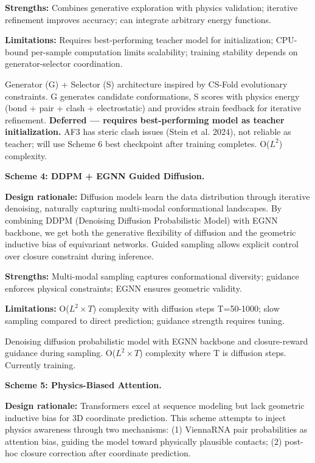 \documentclass[12pt]{article}
\begin{document}
\textbf{Strengths:} Combines generative exploration with physics validation; iterative refinement improves accuracy; can integrate arbitrary energy functions.

\textbf{Limitations:} Requires best-performing teacher model for initialization; CPU-bound per-sample computation limits scalability; training stability depends on generator-selector coordination.

Generator (G) + Selector (S) architecture inspired by CS-Fold evolutionary constraints. G generates candidate conformations, S scores with physics energy (bond + pair + clash + electrostatic) and provides strain feedback for iterative refinement. \textbf{Deferred --- requires best-performing model as teacher initialization.} AF3 has steric clash issues (Stein et al. 2024), not reliable as teacher; will use Scheme 6 best checkpoint after training completes. O($L^2$) complexity.

\textbf{Scheme 4: DDPM + EGNN Guided Diffusion.}

\textbf{Design rationale:} Diffusion models learn the data distribution through iterative denoising, naturally capturing multi-modal conformational landscapes. By combining DDPM (Denoising Diffusion Probabilistic Model) \citep{ho2020} with EGNN backbone, we get both the generative flexibility of diffusion and the geometric inductive bias of equivariant networks. Guided sampling allows explicit control over closure constraint during inference.

\textbf{Strengths:} Multi-modal sampling captures conformational diversity; guidance enforces physical constraints; EGNN ensures geometric validity.

\textbf{Limitations:} O($L^2 \times T$) complexity with diffusion steps T=50-1000; slow sampling compared to direct prediction; guidance strength requires tuning.

Denoising diffusion probabilistic model \citep{ho2020} with EGNN backbone and closure-reward guidance during sampling. O($L^2 \times T$) complexity where T is diffusion steps. Currently training.

\textbf{Scheme 5: Physics-Biased Attention.}

\textbf{Design rationale:} Transformers excel at sequence modeling but lack geometric inductive bias for 3D coordinate prediction. This scheme attempts to inject physics awareness through two mechanisms: (1) ViennaRNA pair probabilities as attention bias, guiding the model toward physically plausible contacts; (2) post-hoc closure correction after coordinate prediction.
\end{document}
